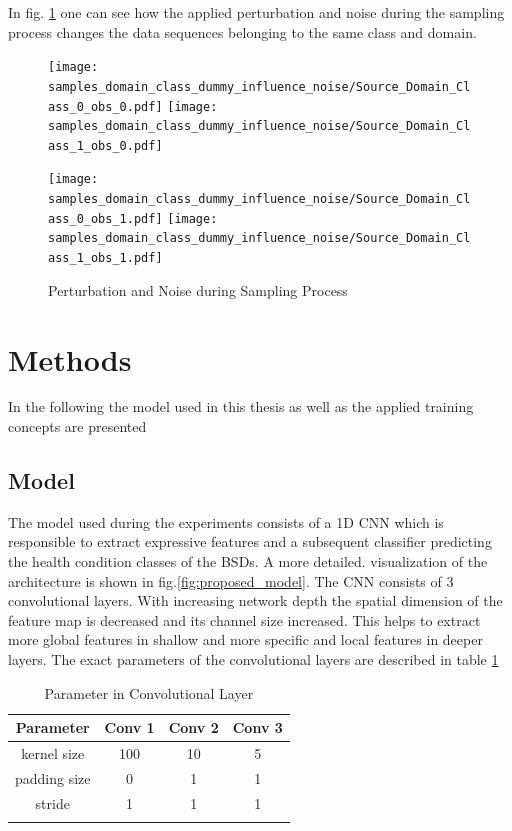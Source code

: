 In fig. \ref{fig:samples_domain_class_dummy_influence_noise} one can see how the applied perturbation and noise during the sampling process changes the data sequences belonging to the same class and domain. 


\begin{figure}[H]
  \centering
  \texttt{[image: samples\_domain\_class\_dummy\_influence\_noise/Source\_Domain\_Class\_0\_obs\_0.pdf]}
  \hspace{.3cm}
  \texttt{[image: samples\_domain\_class\_dummy\_influence\_noise/Source\_Domain\_Class\_1\_obs\_0.pdf]}

  \vspace{.3cm}

  \texttt{[image: samples\_domain\_class\_dummy\_influence\_noise/Source\_Domain\_Class\_0\_obs\_1.pdf]}
  \hspace{.3cm}
  \texttt{[image: samples\_domain\_class\_dummy\_influence\_noise/Source\_Domain\_Class\_1\_obs\_1.pdf]}

  \caption{Perturbation and Noise during Sampling Process}
  \label{fig:samples_domain_class_dummy_influence_noise}
\end{figure}



\section{Methods}\label{chapter:introduction}
In the following the model used in this thesis as well as the applied training concepts are presented

\subsection{Model}
\label{sec:model}
The model used during the experiments consists of a 1D CNN which is responsible to extract expressive features and a subsequent classifier predicting the health condition classes of the BSDs. A more detailed. visualization of the architecture is shown in fig.\ref{fig:proposed_model}. The CNN consists of 3 convolutional layers. With increasing network depth the spatial dimension of the feature map is decreased and its channel size increased. This helps to extract more global features in shallow and more specific and local features in deeper layers. The exact parameters of the convolutional layers are described in table \ref{tab:parameter_conv} 

\begin{longtable}{c c c c} 
\toprule
Parameter & Conv 1 & Conv 2 & Conv 3 \\
\midrule
kernel size & 100 & 10 & 5 \\

padding size & 0 & 1 & 1 \\

stride & 1 & 1 & 1 \\
\bottomrule
\caption {Parameter in Convolutional Layer}
\label {tab:parameter_conv}
\end{longtable}

